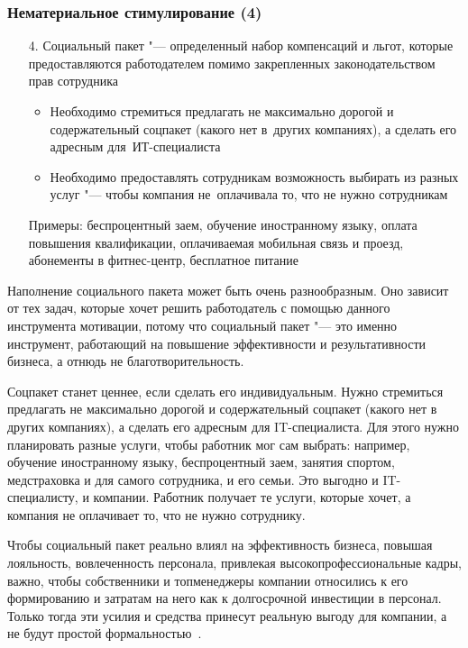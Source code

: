 \documentclass{../industrial-development}
\begin{document}
\begin{frame} \frametitle{Нематериальное стимулирование (4)}
	\begin{itemize}
		\item[4.] \alert{Социальный пакет} "--- определенный набор компенсаций и льгот, которые предоставляются работодателем помимо закрепленных законодательством прав сотрудника
		\begin{itemize}
			\item Необходимо стремиться предлагать не максимально дорогой и содержательный соцпакет (какого нет в~других компаниях), а сделать его адресным для~ИТ-специалиста
			\item Необходимо предоставлять сотрудникам возможность выбирать из разных услуг "--- чтобы компания не~оплачивала то, что не нужно сотрудникам
		\end{itemize}
		Примеры: беспроцентный заем, обучение иностранному языку, оплата повышения квалификации, оплачиваемая мобильная связь и проезд, абонементы в фитнес-центр, бесплатное питание
	\end{itemize}
\end{frame}

\lecturenotes

Наполнение социального пакета может быть очень разнообразным. Оно зависит от тех задач, которые хочет решить работодатель с помощью данного инструмента мотивации, потому что социальный пакет "--- это именно инструмент, работающий на повышение эффективности и результативности бизнеса, а отнюдь не благотворительность.

Соцпакет станет ценнее, если сделать его индивидуальным. Нужно стремиться предлагать не максимально дорогой и содержательный соцпакет (какого нет в других компаниях), а сделать его адресным для IT-специалиста. Для этого нужно планировать разные услуги, чтобы работник мог сам выбрать: например, обучение иностранному языку, беспроцентный заем, занятия спортом, медстраховка и для самого сотрудника, и его семьи. Это выгодно и IT-специалисту, и компании. Работник получает те услуги, которые хочет, а компания не оплачивает то, что не нужно сотруднику.

Чтобы социальный пакет реально влиял на эффективность бизнеса, повышая лояльность, вовлеченность персонала, привлекая высокопрофессиональные кадры, важно, чтобы собственники и топ­менеджеры компании относились к его формированию и затратам на него как к долгосрочной инвестиции в персонал. Только тогда эти усилия и средства принесут реальную выгоду для компании, а не будут простой формальностью~\cite{VchemosobenIT}.
\end{document}
